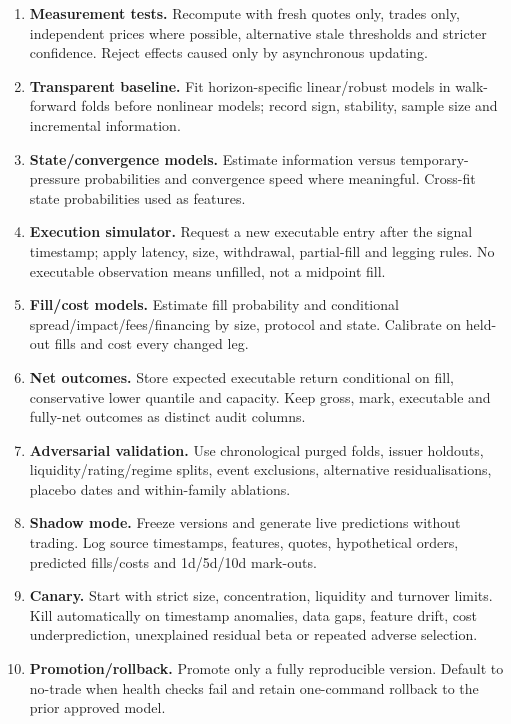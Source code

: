 \documentclass[10pt]{article}
\begin{document}
\begin{enumerate}[leftmargin=2em,label=\textbf{A\arabic*.}]
\item \textbf{Measurement tests.} Recompute with fresh quotes only, trades only, independent prices where possible, alternative stale thresholds and stricter confidence. Reject effects caused only by asynchronous updating.
\item \textbf{Transparent baseline.} Fit horizon-specific linear/robust models in walk-forward folds before nonlinear models; record sign, stability, sample size and incremental information.
\item \textbf{State/convergence models.} Estimate information versus temporary-pressure probabilities and convergence speed where meaningful. Cross-fit state probabilities used as features.
\item \textbf{Execution simulator.} Request a new executable entry after the signal timestamp; apply latency, size, withdrawal, partial-fill and legging rules. No executable observation means unfilled, not a midpoint fill.
\item \textbf{Fill/cost models.} Estimate fill probability and conditional spread/impact/fees/financing by size, protocol and state. Calibrate on held-out fills and cost every changed leg.
\item \textbf{Net outcomes.} Store expected executable return conditional on fill, conservative lower quantile and capacity. Keep gross, mark, executable and fully-net outcomes as distinct audit columns.
\item \textbf{Adversarial validation.} Use chronological purged folds, issuer holdouts, liquidity/rating/regime splits, event exclusions, alternative residualisations, placebo dates and within-family ablations.
\item \textbf{Shadow mode.} Freeze versions and generate live predictions without trading. Log source timestamps, features, quotes, hypothetical orders, predicted fills/costs and 1d/5d/10d mark-outs.
\item \textbf{Canary.} Start with strict size, concentration, liquidity and turnover limits. Kill automatically on timestamp anomalies, data gaps, feature drift, cost underprediction, unexplained residual beta or repeated adverse selection.
\item \textbf{Promotion/rollback.} Promote only a fully reproducible version. Default to no-trade when health checks fail and retain one-command rollback to the prior approved model.
\end{enumerate}
\end{document}
